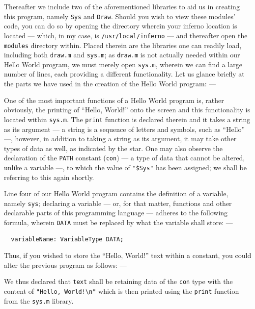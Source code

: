 \documentclass[a5paper,twoside,12pt]{report}
\begin{document}
Thereafter we include two of the aforementioned libraries to aid us in creating this program, namely \texttt{Sys} and \texttt{Draw}. Should you wish to view these modules' code, you can do so by opening the directory wherein your inferno location is located — which, in my case, is \texttt{/usr/local/inferno} — and thereafter open the \texttt{modules} directory within. Placed therein are the libraries one can readily load, including both \texttt{draw.m} and \texttt{sys.m}; as \texttt{draw.m} is not actually needed within our Hello World program, we must merely open \texttt{sys.m}, wherein we can find a large number of lines, each providing a different functionality. Let us glance briefly at the parts we have used in the creation of the Hello World program: —



One of the most important functions of a Hello World program is, rather obviously, the printing of ``Hello, World!'' onto the screen and this functionality is located within \texttt{sys.m}. The \texttt{print} function is declared therein and it takes a string as its argument — a string is a sequence of letters and symbols, such as ``Hello'' —, however, in addition to taking a string as its argument, it may take other types of data as well, as indicated by the star. One may also observe the declaration of the \texttt{PATH} constant (\texttt{con}) — a type of data that cannot be altered, unlike a variable —, to which the value of \texttt{"\$Sys"} has been assigned; we shall be referring to this again shortly.

Line four of our Hello World program contains the definition of a variable, namely \texttt{sys}; declaring a variable — or, for that matter, functions and other declarable parts of this programming language — adheres to the following formula, wherein \texttt{DATA} must be replaced by what the variable shall store: —

\begin{lstlisting}
  variableName: VariableType DATA;
\end{lstlisting}

Thus, if you wished to store the ``Hello, World!'' text within a constant, you could alter the previous program as follows: —



We thus declared that \texttt{text} shall be retaining data of the \texttt{con} type with the content of \texttt{"Hello, World!\textbackslash n"} which is then printed using the \texttt{print} function from the \texttt{sys.m} library.
\end{document}
